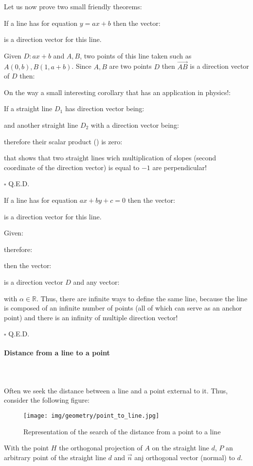 	Let us now prove two small friendly theorems:
	\begin{theorem}
	If a line has for equation $y=ax+b$ then the vector:
	
	is a direction vector for this line.
	\end{theorem}
	\begin{dem}
	Given $D:ax+b$ and $A, B$, two points of this line taken such as ${A(0,b),B(1,a+b)}$. Since $A, B$ are two points $D$ then $\overrightarrow{AB}$ is a direction vector of $D$ then:
	
	On the way a small interesting corollary that has an application in physics!:
	
	If a straight line $D_1$ has direction vector being:
	
	and another straight line $D_2$ with a direction vector being:
	
	therefore their scalar product () is zero:
	
	that shows that two straight lines wich multiplication of slopes (second coordinate of the direction vector) is equal to $-1$ are perpendicular!
	\begin{flushright}
		$\square$  Q.E.D.
	\end{flushright}
	\end{dem}
	\begin{theorem}
	If a line has for equation $ax+by+c=0$ then the vector:
	
	is a direction vector for this line.
	\end{theorem}
	\begin{dem}
	Given:
	
	therefore:
	
	then the vector:
	
	is a direction vector $D$ and any vector:
	
	with $\alpha\in \mathbb{R}$.
	Thus, there are infinite ways to define the same line, because the line is composed of an infinite number of points (all of which can serve as an anchor point) and there is an infinity of multiple direction vector!
	\begin{flushright}
		$\square$  Q.E.D.
	\end{flushright}
	\end{dem}
	
	\pagebreak
	\paragraph{Distance from a line to a point}\mbox{}\\\\
	Often we seek the distance between a line and a point external to it. Thus, consider the following figure:
	\begin{figure}[H]
		\centering
		\texttt{[image: img/geometry/point\_to\_line.jpg]}
		\caption{Representation of the search of the distance from a point to a line}
	\end{figure}
	With the point $H$ the orthogonal projection of $A$ on the straight line $d$, $P$ an arbitrary point of the straight line $d$ and $\vec{n}$ anj orthogonal vector (normal) to $d$.
	
